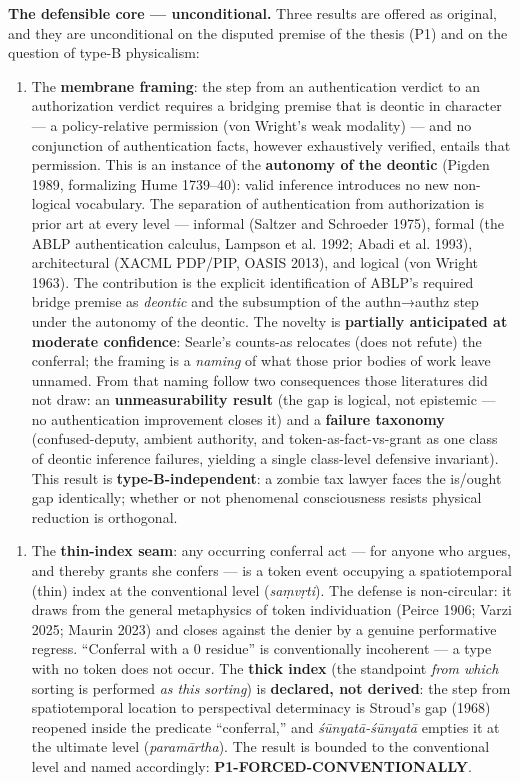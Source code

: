 \documentclass[11pt]{article}
\begin{document}
\textbf{The defensible core — unconditional.} Three results are offered as original, and they are unconditional on the disputed premise of the thesis (P1) and on the question of type-B physicalism:

\begin{enumerate}
\item The \textbf{membrane framing}: the step from an authentication verdict to an authorization verdict requires a bridging premise that is deontic in character — a policy-relative permission (von Wright's weak modality) — and no conjunction of authentication facts, however exhaustively verified, entails that permission. This is an instance of the \textbf{autonomy of the deontic} (Pigden 1989, formalizing Hume 1739–40): valid inference introduces no new non-logical vocabulary. The separation of authentication from authorization is prior art at every level — informal (Saltzer and Schroeder 1975), formal (the ABLP authentication calculus, Lampson et al. 1992; Abadi et al. 1993), architectural (XACML PDP/\allowbreak{}PIP, OASIS 2013), and logical (von Wright 1963). The contribution is the explicit identification of ABLP's required bridge premise as \emph{deontic} and the subsumption of the authn→authz step under the autonomy of the deontic. The novelty is \textbf{partially anticipated at moderate confidence}: Searle's counts-as relocates (does not refute) the conferral; the framing is a \emph{naming} of what those prior bodies of work leave unnamed. From that naming follow two consequences those literatures did not draw: an \textbf{unmeasurability result} (the gap is logical, not epistemic — no authentication improvement closes it) and a \textbf{failure taxonomy} (confused-deputy, ambient authority, and token-as-fact-vs-grant as one class of deontic inference failures, yielding a single class-level defensive invariant). This result is \textbf{type-B-independent}: a zombie tax lawyer faces the is/\allowbreak{}ought gap identically; whether or not phenomenal consciousness resists physical reduction is orthogonal.
\end{enumerate}

\begin{enumerate}
\item The \textbf{thin-index seam}: any occurring conferral act — for anyone who argues, and thereby grants she confers — is a token event occupying a spatiotemporal (thin) index at the conventional level (\emph{saṃvṛti}). The defense is non-circular: it draws from the general metaphysics of token individuation (Peirce 1906; Varzi 2025; Maurin 2023) and closes against the denier by a genuine performative regress. ``Conferral with a 0 residue'' is conventionally incoherent — a type with no token does not occur. The \textbf{thick index} (the standpoint \emph{from which} sorting is performed \emph{as this sorting}) is \textbf{declared, not derived}: the step from spatiotemporal location to perspectival determinacy is Stroud's gap (1968) reopened inside the predicate ``conferral,'' and \emph{śūnyatā-śūnyatā} empties it at the ultimate level (\emph{paramārtha}). The result is bounded to the conventional level and named accordingly: \textbf{P1-FORCED-CONVENTIONALLY}.
\end{enumerate}
\end{document}
